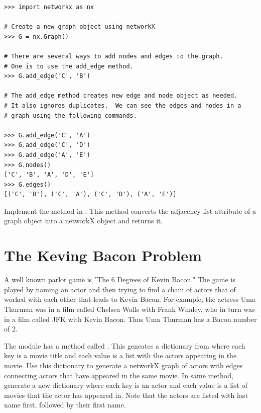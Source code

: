 \begin{lstlisting}
>>> import networkx as nx

# Create a new graph object using networkX
>>> G = nx.Graph()

# There are several ways to add nodes and edges to the graph.
# One is to use the add_edge method.
>>> G.add_edge('C', 'B')

# The add_edge method creates new edge and node object as needed.
# It also ignores duplicates.  We can see the edges and nodes in a
# graph using the following commands.

>>> G.add_edge('C', 'A')
>>> G.add_edge('C', 'D')
>>> G.add_edge('A', 'E')
>>> G.nodes()
['C', 'B', 'A', 'D', 'E']
>>> G.edges()
[('C', 'B'), ('C', 'A'), ('C', 'D'), ('A', 'E')]
\end{lstlisting}

\begin{problem}
Implement the  method in .
This method converts the adjacency list attribute of a graph object into a networkX object and returns it.
\end{problem}

\section*{The Keving Bacon Problem}

A well known parlor game is "The 6 Degrees of Kevin Bacon."
The game is played by naming an actor and then trying to find a chain of actors that of worked with each other that leads to Kevin Bacon.
For example, the actress Uma Thurman was in a film called Chelsea Walls with Frank Whaley, who in turn was in a film called JFK with Kevin Bacon.
Thus Uma Thurman has a Bacon number of 2.

\begin{problem}
The  module has a method called .
This geneates a dictionary from  where each key is a movie title and each value is a list with the actors appearing in the movie.
Use this dictionary to generate a networkX graph of actors with edges connecting actors that have appeared in the same movie.
In same method, generate a new dictionary where each key is an actor and each value is a list of movies that the actor has appeared in.
Note that the actors are listed with last name first, followed by their first name.
\end{problem}

